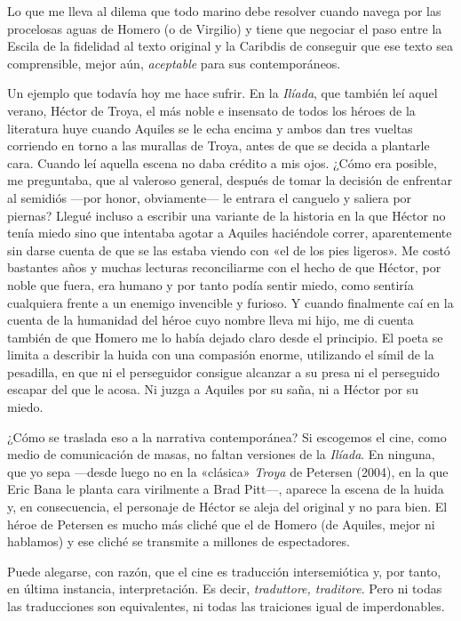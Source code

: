\documentclass[11pt,a4paper]{article}
\begin{document}
Lo que me lleva al dilema que todo marino debe resolver cuando navega por las procelosas aguas de Homero (o de Virgilio) y tiene que negociar el paso entre la Escila de la fidelidad al texto original y la Caribdis de conseguir que ese texto sea comprensible, mejor aún, \emph{aceptable} para sus contemporáneos.

Un ejemplo que todavía hoy me hace sufrir. En la \emph{Ilíada}, que también leí aquel verano, Héctor de Troya, el más noble e insensato de todos los héroes de la literatura huye cuando Aquiles se le echa encima y ambos dan tres vueltas corriendo en torno a las murallas de Troya, antes de que se decida a plantarle cara. Cuando leí aquella escena no daba crédito a mis ojos. ¿Cómo era posible, me preguntaba, que al valeroso general, después de tomar la decisión de enfrentar al semidiós ---por honor, obviamente--- le entrara el canguelo y saliera por piernas? Llegué incluso a escribir una variante de la historia en la que Héctor no tenía miedo sino que intentaba agotar a Aquiles haciéndole correr, aparentemente sin darse cuenta de que se las estaba viendo con «el de los pies ligeros». Me costó bastantes años y muchas lecturas reconciliarme con el hecho de que Héctor, por noble que fuera, era humano y por tanto podía sentir miedo, como sentiría cualquiera frente a un enemigo invencible y furioso. Y cuando finalmente caí en la cuenta de la humanidad del héroe cuyo nombre lleva mi hijo, me di cuenta también de que Homero me lo había dejado claro desde el principio. El poeta se limita a describir la huida con una compasión enorme, utilizando el símil de la pesadilla, en que ni el perseguidor consigue alcanzar a su presa ni el perseguido escapar del que le acosa. Ni juzga a Aquiles por su saña, ni a Héctor por su miedo. 

¿Cómo se traslada eso a la narrativa contemporánea? Si escogemos el cine, como medio de comunicación de masas, no faltan versiones de la \emph{Ilíada}. En ninguna, que yo sepa ---desde luego no en la «clásica» \emph{Troya} de Petersen (2004), en la que Eric Bana le planta cara virilmente a Brad Pitt---, aparece la escena de la huida y, en consecuencia, el personaje de Héctor se aleja del original y no para bien. El héroe de Petersen es mucho más cliché que el de Homero (de Aquiles, mejor ni hablamos) y ese cliché se transmite a millones de espectadores. 

Puede alegarse, con razón, que el cine es traducción intersemiótica y, por tanto, en última instancia, interpretación. Es decir, \emph{traduttore, traditore}. Pero ni todas las traducciones son equivalentes, ni todas las traiciones igual de imperdonables. 
	
\end{document}
